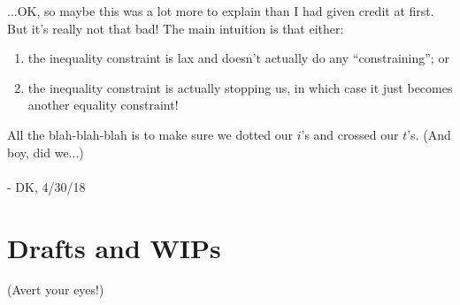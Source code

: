 \documentclass[letterpaper,12pt]{report}
\providecommand{\tightlist}{%
  \setlength{\itemsep}{0pt}\setlength{\parskip}{0pt}}
\begin{document}
...OK, so maybe this was a lot more to explain than I had given credit
at first. But it's really not that bad! The main intuition is that either:
\begin{enumerate}
  \tightlist
  \item
    the inequality constraint is lax and doesn't actually do any
``constraining''; or 
  \item 
    the inequality constraint is actually stopping us,
    in which case it just becomes another equality constraint!
\end{enumerate}
All the blah-blah-blah is to make sure we dotted our \(i\)'s and crossed
our \(t\)'s. (And boy, did we...)
\\
\\
- DK, 4/30/18

\newpage


\chapter{Drafts and WIPs}\label{drafts-and-wips}

(Avert your eyes!)



\end{document}
